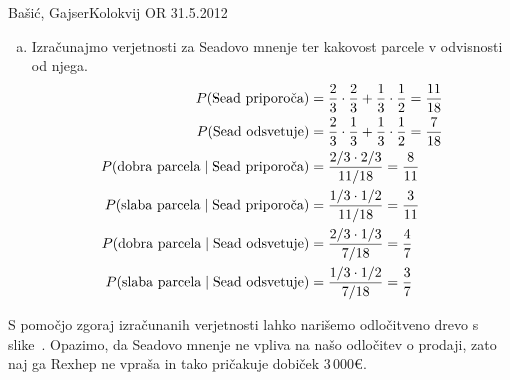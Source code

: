 \begin{naloga}{Bašić, Gajser}{Kolokvij OR 31.5.2012}
\begin{odgovor}
\begin{enumerate}[(a)]
\item Izračunajmo verjetnosti za Seadovo mnenje
ter kakovost parcele v odvisnosti od njega.
\begin{align*}
P(\text{Sead priporoča}) &=
{2 \over 3} \cdot {2 \over 3} + {1 \over 3} \cdot {1 \over 2}
= {11 \over 18} \\
P(\text{Sead odsvetuje}) &=
{2 \over 3} \cdot {1 \over 3} + {1 \over 3} \cdot {1 \over 2}
= {7 \over 18} \\
P(\text{dobra parcela} \;|\; \text{Sead priporoča})
&= {2/3 \cdot 2/3 \over 11/18} = {8 \over 11} \\
P(\text{slaba parcela} \;|\; \text{Sead priporoča})
&= {1/3 \cdot 1/2 \over 11/18} = {3 \over 11} \\
P(\text{dobra parcela} \;|\; \text{Sead odsvetuje})
&= {2/3 \cdot 1/3 \over 7/18} = {4 \over 7} \\
P(\text{slaba parcela} \;|\; \text{Sead odsvetuje})
&= {1/3 \cdot 1/2 \over 7/18} = {3 \over 7}
\end{align*}
\end{enumerate}
S pomočjo zgoraj izračunanih verjetnosti
lahko narišemo odločitveno drevo s slike~\fig.
Opazimo, da Seadovo mnenje ne vpliva na našo odločitev o prodaji,
zato naj ga Rexhep ne vpraša in tako pričakuje dobiček $3\,000 €$.

\begin{slika}
\makebox[\textwidth][c]{
\pgfslika
}
\end{slika}
\end{odgovor}
\end{naloga}
